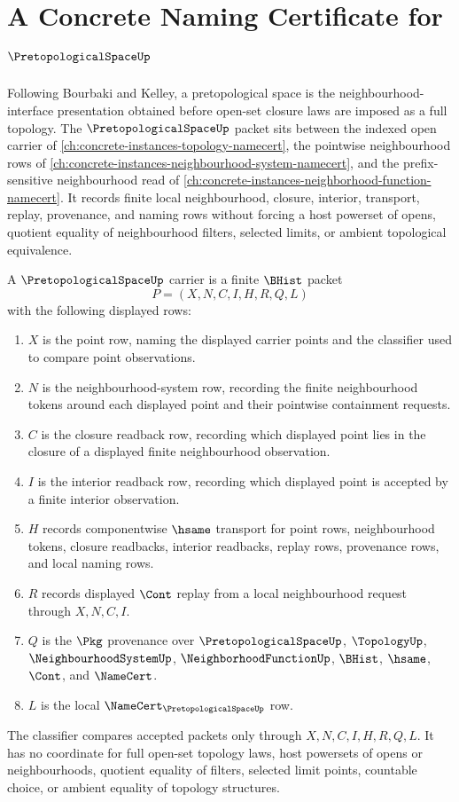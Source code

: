 \chapter{A Concrete Naming Certificate for $\PretopologicalSpaceUp$}
\label{ch:concrete-instances-pretopological-space-namecert}

Following Bourbaki and Kelley, a pretopological space is the neighbourhood-interface presentation obtained before open-set closure laws are imposed as a full topology. The $\PretopologicalSpaceUp$ packet sits between the indexed open carrier of \autoref{ch:concrete-instances-topology-namecert}, the pointwise neighbourhood rows of \autoref{ch:concrete-instances-neighbourhood-system-namecert}, and the prefix-sensitive neighbourhood read of \autoref{ch:concrete-instances-neighborhood-function-namecert}. It records finite local neighbourhood, closure, interior, transport, replay, provenance, and naming rows without forcing a host powerset of opens, quotient equality of neighbourhood filters, selected limits, or ambient topological equivalence.

\begin{definition}
\label{def:pretopological-space-carrier}
A $\PretopologicalSpaceUp$ carrier is a finite $\BHist$ packet
$$
P=(X,N,C,I,H,R,Q,L)
$$
with the following displayed rows:
\begin{enumerate}
\item $X$ is the point row, naming the displayed carrier points and the classifier used to compare point observations.
\item $N$ is the neighbourhood-system row, recording the finite neighbourhood tokens around each displayed point and their pointwise containment requests.
\item $C$ is the closure readback row, recording which displayed point lies in the closure of a displayed finite neighbourhood observation.
\item $I$ is the interior readback row, recording which displayed point is accepted by a finite interior observation.
\item $H$ records componentwise $\hsame$ transport for point rows, neighbourhood tokens, closure readbacks, interior readbacks, replay rows, provenance rows, and local naming rows.
\item $R$ records displayed $\Cont$ replay from a local neighbourhood request through $X,N,C,I$.
\item $Q$ is the $\Pkg$ provenance over $\PretopologicalSpaceUp$, $\TopologyUp$, $\NeighbourhoodSystemUp$, $\NeighborhoodFunctionUp$, $\BHist$, $\hsame$, $\Cont$, and $\NameCert$.
\item $L$ is the local $\NameCert_{\PretopologicalSpaceUp}$ row.
\end{enumerate}
The classifier compares accepted packets only through $X,N,C,I,H,R,Q,L$. It has no coordinate for full open-set topology laws, host powersets of opens or neighbourhoods, quotient equality of filters, selected limit points, countable choice, or ambient equality of topology structures.
\end{definition}

